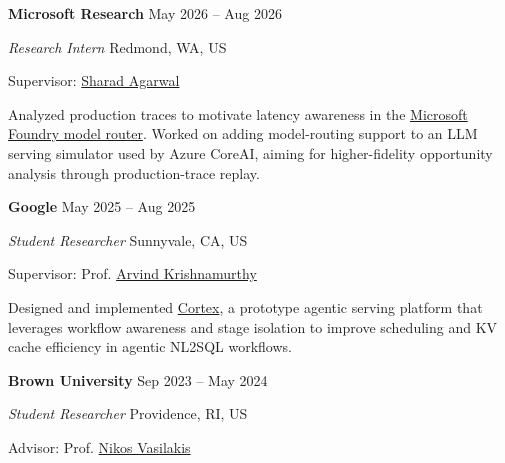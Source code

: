 \documentclass[margin,11pt]{resume}
\newcommand{\descriptionVSpace}{\vspace{0.5ex}\xspace}
\newcommand{\subsectionVSpace}{\vspace{4.5ex}\xspace}
\newcommand{\sectionVSpace}{\vspace{1ex}\xspace} %
\newcommand{\header}[1]{\textbf{#1}\xspace}
\newcommand{\company}[1]{\header{#1}\xspace}
\newcommand{\interval}[2]{#1 -- #2\xspace}
\newcommand{\place}[1]{#1\xspace}
\newcommand{\jobRole}[1]{\textit{#1}\xspace}
\newcommand{\stitle}[1]{#1:\xspace}
\newlength{\cvsectionbodyoffset}
\newlength{\cvsectionwidestheaderwidth}
\newcommand{\recordCvSectionHeaderWidth}{%
	\ifdim\wd\cvsectionheaderbox>\cvsectionwidestheaderwidth
		\global\cvsectionwidestheaderwidth=\wd\cvsectionheaderbox
	\fi
}
\newcommand{\entryNeedspace}{\par\Needspace{2\baselineskip}}
\newenvironment{jobDuties}{\descriptionVSpace}{\par}
\newenvironment{rSection}[1]{%
	\par
	\setCvSectionHeader{#1}%
	\recordCvSectionHeaderWidth%
	\begin{list}{}{%
		\setlength{\leftmargin}{\cvsectionbodyoffset}%
		\setlength{\rightmargin}{0pt}%
		\setlength{\labelwidth}{\cvsectionbodyoffset}%
		\setlength{\labelsep}{0pt}%
		\setlength{\itemindent}{0pt}%
		\setlength{\listparindent}{0pt}%
		\setlength{\topsep}{0pt}%
		\setlength{\partopsep}{0pt}%
		\setlength{\parsep}{0pt}%
		\setlength{\itemsep}{0pt}%
		\renewcommand{\makelabel}[1]{\makebox[\labelwidth][l]{\raisebox{0pt}[0pt][0pt]{##1}}}%
	}%
	\item[\usebox{\cvsectionheaderbox}]%
}{\end{list}\sectionVSpace\par}
\newenvironment{rSubsection}{\entryNeedspace}{\par\subsectionVSpace}
\begin{document}
\begin{resume}
\begin{rSection}{Education}
\begin{rSubsection}
		\end{rSubsection}
	\end{rSection}

	\begin{rSection}{Experience}
		\begin{rSubsection}
			\company{Microsoft Research} \hfill \interval{May 2026}{Aug 2026}

			\jobRole{Research Intern} \hfill \place{Redmond, WA, US}

			\stitle{Supervisor} \href{http://sharadagarwal.net}{Sharad Agarwal}

			\begin{jobDuties}
				Analyzed production traces to motivate latency awareness in the \href{https://learn.microsoft.com/en-us/azure/foundry/openai/concepts/model-router}{Microsoft Foundry model router}. Worked on adding model-routing support to an LLM serving simulator used by Azure CoreAI, aiming for higher-fidelity opportunity analysis through production-trace replay.
			\end{jobDuties}
		\end{rSubsection}

		\begin{rSubsection}
			\company{Google} \hfill \interval{May 2025}{Aug 2025}

			\jobRole{Student Researcher} \hfill \place{Sunnyvale, CA, US}

			\stitle{Supervisor} Prof. \href{https://sites.google.com/cs.washington.edu/arvind}{Arvind Krishnamurthy}

			\begin{jobDuties}
				Designed and implemented \href{https://saa2025.github.io/papers/Cortex - Workflow-Aware Resource Pooling and Scheduling for Agentic Serving.pdf}
				{Cortex}, a prototype agentic serving platform that leverages workflow awareness and stage isolation to improve scheduling and KV cache efficiency in agentic NL2SQL workflows.
			\end{jobDuties}
		\end{rSubsection}

		\begin{rSubsection}
			\company{Brown University} \hfill \interval{Sep 2023}{May 2024}

			\jobRole{Student Researcher} \hfill \place{Providence, RI, US}

			\stitle{Advisor} Prof. \href{https://nikos.vasilak.is}{Nikos Vasilakis}


\end{rSubsection}
\end{rSection}
\end{resume}
\end{document}
